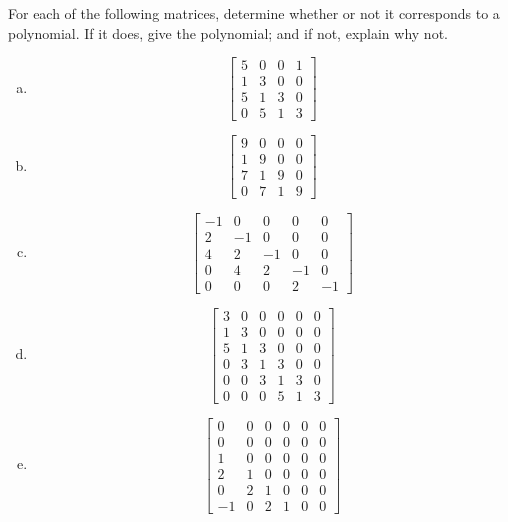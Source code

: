 \begin{exercise}{}
For each of the following matrices, determine whether or not it corresponds to a polynomial.  If it does, give the polynomial; and if not, explain why not.
\begin{multicols}{2}
\begin{enumerate}[(a)]
	\item
\[\left[\begin{array}{cccc}5 & 0 & 0 & 1\\1 & 3 & 0 & 0\\5 & 1 & 3 & 0\\0 & 5 & 1 & 3\end{array}\right]\]	
	\item 
\[\left[\begin{array}{cccc}9 & 0 & 0 & 0\\1 & 9 & 0 & 0\\7 & 1 & 9 & 0\\0 & 7 & 1 & 9\end{array}\right]\]	
	\item
\[\left[\begin{array}{ccccc}-1 & 0 & 0 & 0 & 0\\2 & -1 & 0 & 0 & 0\\4 & 2 & -1 & 0 & 0\\0 & 4 & 2 & -1 & 0\\0 & 0 & 0 & 2 & -1\end{array}\right]\]
\item
\[\left[\begin{array}{cccccc}3 & 0 & 0 & 0 & 0 & 0\\1 & 3 & 0 & 0 & 0 & 0\\5 & 1 & 3 & 0 & 0 & 0\\0 & 3 & 1 & 3 & 0 & 0\\0 & 0 & 3 & 1 & 3 & 0\\0 & 0 & 0 & 5 & 1 & 3\end{array}\right]\]
\item
\[\left[\begin{array}{cccccc}0 & 0 & 0 & 0 & 0 & 0\\0 & 0 & 0 & 0 & 0 & 0\\1 & 0 & 0 & 0 & 0 & 0\\ 2 & 1 & 0 & 0 & 0 & 0\\0 & 2 & 1 & 0 & 0 & 0\\-1 & 0 & 2 & 1 & 0 & 0\end{array}\right]\]
\end{enumerate}
\end{multicols}
\end{exercise}

